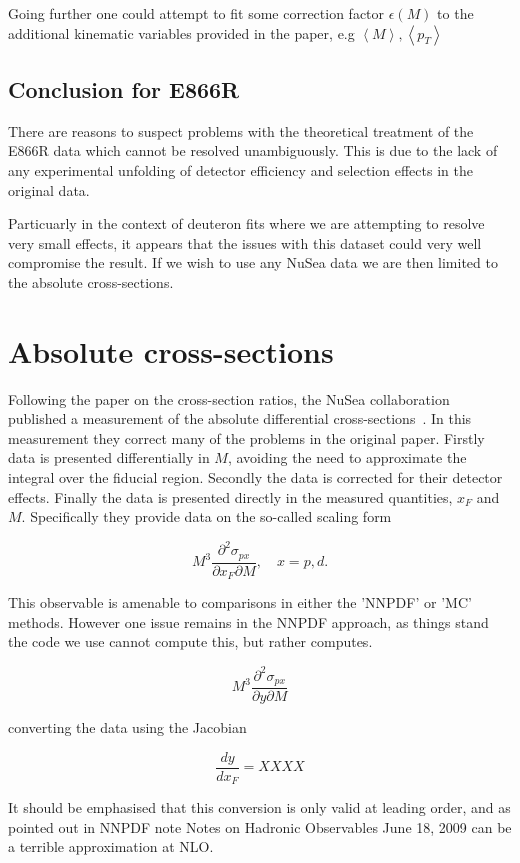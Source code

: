 \documentclass[11pt]{article}
\newcommand{\be}{\begin{equation}}
\newcommand{\ee}{\end{equation}}
\begin{document}
Going further one could attempt to fit some correction factor $\epsilon(M)$ to the additional kinematic variables
provided in the paper, e.g $\left<M\right>, \left<p_T\right>$

\subsection{Conclusion for E866R}

There are reasons to suspect problems with the theoretical treatment of the E866R data which cannot be resolved unambiguously.
This is due to the lack of any experimental unfolding of detector efficiency and selection effects in the original data.

Particuarly in the context of deuteron fits where we are attempting to resolve very small effects, it appears that the
issues with this dataset could very well compromise the result. If we wish to use any NuSea data we are then limited to the absolute cross-sections.

\section{Absolute cross-sections}
Following the paper on the cross-section ratios, the NuSea collaboration published a measurement of the absolute differential cross-sections~\cite{Webb:2003ps}.
In this measurement they correct many of the problems in the original paper. Firstly data is presented differentially in $M$, avoiding the need to approximate
the integral over the fiducial region. Secondly the data is corrected for their detector effects. Finally the data is presented directly in the measured quantities,
$x_F$ and $M$. Specifically they provide data on the so-called scaling form

\be M^3 \frac{\partial^2 \sigma_{px}}{\partial x_F \partial M}, \quad x = p,d.\ee

This observable is amenable to comparisons in either the 'NNPDF' or 'MC' methods. However one issue remains in the NNPDF approach, as things stand the code
we use cannot compute this, but rather computes.

\be M^3 \frac{\partial^2 \sigma_{px}}{\partial y \partial M} \ee

converting the data using the Jacobian

\be \frac{dy}{dx_F} =XXXX \ee 

It should be emphasised that this conversion is only valid at leading order, and as pointed out in NNPDF note Notes on Hadronic Observables June 18, 2009
can be a terrible approximation at NLO.
\end{document}
